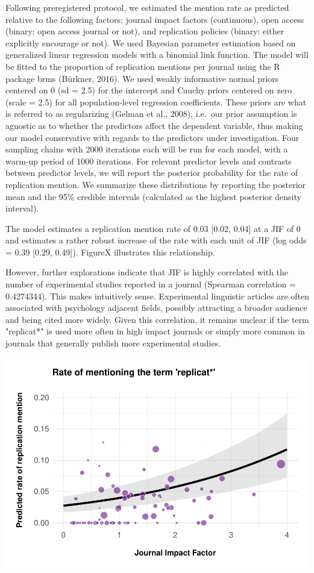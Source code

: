 \documentclass[]{elsarticle} %
\begin{document}
Following preregistered protocol, we estimated the mention rate as
predicted relative to the following factors: journal impact factors
(continuous), open access (binary: open access journal or not), and
replication policies (binary: either explicitly encourage or not). We
used Bayesian parameter estimation based on generalized linear
regression models with a binomial link function. The model will be
fitted to the proportion of replication mentions per journal using the R
package brms (Bürkner, 2016). We used weakly informative normal priors
centered on 0 (sd = 2.5) for the intercept and Cauchy priors centered on
zero (scale = 2.5) for all population-level regression coefficients.
These priors are what is referred to as regularizing (Gelman et al.,
2008), i.e.~our prior assumption is agnostic as to whether the
predictors affect the dependent variable, thus making our model
conservative with regards to the predictors under investigation. Four
sampling chains with 2000 iterations each will be run for each model,
with a warm-up period of 1000 iterations. For relevant predictor levels
and contrasts between predictor levels, we will report the posterior
probability for the rate of replication mention. We summarize these
distributions by reporting the posterior mean and the 95\% credible
intervals (calculated as the highest posterior density interval).

The model estimates a replication mention rate of 0.03 {[}0.02, 0.04{]}
at a JIF of 0 and estimates a rather robust increase of the rate with
each unit of JIF (log odds = 0.39 {[}0.29, 0.49{]}). FigureX illustrates
this relationship.

However, further explorations indicate that JIF is highly correlated
with the number of experimental studies reported in a journal (Spearman
correlation = 0.4274344). This makes intuitively sense. Experimental
linguistic articles are often associated with psychology adjacent
fields, possibly attracting a broader audience and being cited more
widely. Given this correlation, it remains unclear if the term
"replicat*" is used more often in high impact journals or simply more
common in journals that generally publish more experimental studies.

\begin{center}\includegraphics[width=1\linewidth]{ReplicationLing_files/figure-latex/plot_mention_jif-1} \end{center}
\end{document}
